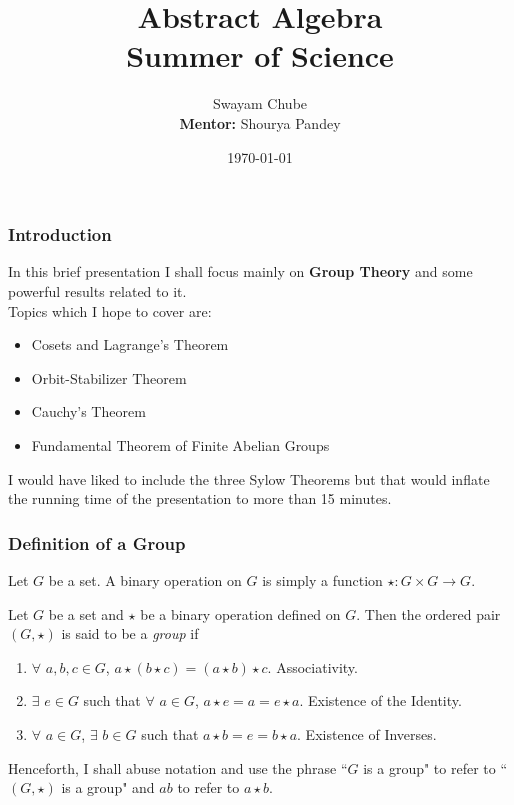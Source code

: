 \documentclass{beamer}
\title{Abstract Algebra\\ Summer of Science}
\author{Swayam Chube \\ \textbf{Mentor: }Shourya Pandey}
\date{\today}
\begin{document}
	\begin{frame}
		\titlepage
	\end{frame}
	
	\begin{frame}
		\frametitle{Introduction}
		In this brief presentation I shall focus mainly on \textbf{Group Theory} and some powerful results related to it.\\
		Topics which I hope to cover are:
		\begin{itemize}
			\item Cosets and Lagrange's Theorem
			\item Orbit-Stabilizer Theorem
			\item Cauchy's Theorem
			\item Fundamental Theorem of Finite Abelian Groups
		\end{itemize}
		I would have liked to include the three Sylow Theorems but that would inflate the running time of the presentation to more than 15 minutes.
	\end{frame}
	
	\begin{frame}
		\frametitle{Definition of a Group}
		\begin{definition}
			Let $G$ be a set. A binary operation on $G$ is simply a function $\star\colon G\times G\to G$.
		\end{definition}
		
		\begin{definition}[Group]
			Let $G$ be a set and $\star$ be a binary operation defined on $G$. Then the ordered pair $(G,\star)$ is said to be a \textit{group} if 
			\begin{enumerate}
				\item $\forall$ $a,b,c\in G$, $a\star(b\star c) = (a\star b)\star c$. Associativity.
				\item $\exists$ $e\in G$ such that $\forall$ $a\in G$, $a\star e = a = e\star a$. Existence of the Identity.
				\item $\forall$ $a\in G$, $\exists$ $b\in G$ such that $a\star b = e = b\star a$. Existence of Inverses.
			\end{enumerate}
		\end{definition}
		
		Henceforth, I shall abuse notation and use the phrase ``$G$ is a group" to refer to ``$(G,\star)$ is a group" and $ab$ to refer to $a\star b$.
	\end{frame}
	
\end{document}
